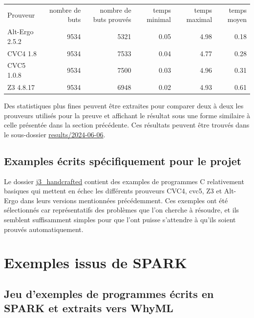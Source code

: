 \documentclass[a4paper,11pt]{article}
\begin{document}
\begin{center}
  \begin{tabular}{|l|r|r|r|r|r|}
    \hline
  \rowcolor{gray!50} Prouveur
  & \multicolumn{1}{p{0.13\textwidth}|}{nombre de buts}
  & \multicolumn{1}{p{0.13\textwidth}|}{nombre de buts prouvés}
  & \multicolumn{1}{p{0.13\textwidth}|}{temps minimal}
  & \multicolumn{1}{p{0.13\textwidth}|}{temps maximal}
  & \multicolumn{1}{p{0.13\textwidth}|}{temps moyen}
  \\
  Alt-Ergo 2.5.2                &  9534 & 5321 & 0.05 & 4.98 & 0.18 \\
  CVC4 1.8                      &  9534 & 7533 & 0.04 & 4.77 & 0.28 \\
  CVC5 1.0.8                    &  9534 & 7500 & 0.03 & 4.96 & 0.31 \\
  Z3 4.8.17                     &  9534 & 6948 & 0.02 & 4.93 & 0.61 \\
    \hline
\end{tabular}
\end{center}

Des statistiques plus fines peuvent être extraites pour comparer deux à deux
les prouveurs utilisés pour la preuve et affichant le résultat sous une forme
similaire à celle présentée dans la section précédente. Ces résultats peuvent
être trouvés dans le sous-dossier \url{results/2024-06-06}.

\subsection*{Examples écrits spécifiquement pour le projet}

Le dossier \url{j3_handcrafted} contient des examples de programmes C
relativement basiques qui mettent en échec les différents prouveurs CVC4, cvc5,
Z3 et Alt-Ergo dans leurs versions mentionnées précédemment.
Ces exemples ont été sélectionnés car représentatifs des problèmes que l'on
cherche à résoudre, et ils semblent suffisamment simples pour que l'ont puisse
s'attendre à qu'ils soient prouvés automatiquement.

\section{Exemples issus de SPARK}

\subsection{Jeu d'exemples de programmes écrits en SPARK et extraits vers WhyML}
\end{document}
